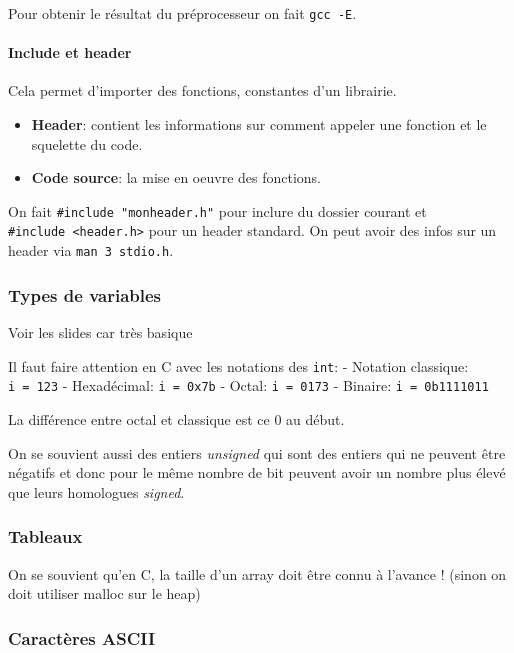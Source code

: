 Pour obtenir le résultat du préprocesseur on fait \texttt{gcc\ -E}.

\paragraph{Include et header}\label{include-et-header}

Cela permet d'importer des fonctions, constantes d'un librairie.

\begin{itemize}
\tightlist
\item
  \textbf{Header}: contient les informations sur comment appeler une
  fonction et le squelette du code.
\item
  \textbf{Code source}: la mise en oeuvre des fonctions.
\end{itemize}

On fait \texttt{\#include\ "monheader.h"} pour inclure du dossier
courant et \texttt{\#include\ \textless{}header.h\textgreater{}} pour un
header standard. On peut avoir des infos sur un header via
\texttt{man\ 3\ stdio.h}.

\subsubsection{Types de variables}\label{types-de-variables}

Voir les slides car très basique

Il faut faire attention en C avec les notations des \texttt{int}: -
Notation classique: \texttt{i\ =\ 123} - Hexadécimal:
\texttt{i\ =\ 0x7b} - Octal: \texttt{i\ =\ 0173} - Binaire:
\texttt{i\ =\ 0b1111011}

La différence entre octal et classique est ce 0 au début.

On se souvient aussi des entiers \emph{unsigned} qui sont des entiers
qui ne peuvent être négatifs et donc pour le même nombre de bit peuvent
avoir un nombre plus élevé que leurs homologues \emph{signed}.

\subsubsection{Tableaux}\label{tableaux}

On se souvient qu'en C, la taille d'un array doit être connu à l'avance
! (sinon on doit utiliser malloc sur le heap)

\subsubsection{Caractères ASCII}\label{caractuxe8res-ascii}

